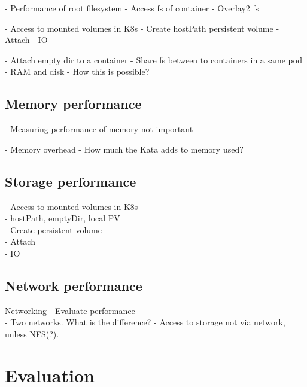 - Performance of root filesystem
	- Access fs of container
	- Overlay2 fs

- Access to mounted volumes in K8s
	- Create hostPath persistent volume
	- Attach
	- IO

- Attach empty dir to a container
	- Share fs between to containers in a same pod
	- RAM and disk
	- How this is possible?

\subsection{Memory performance}

- Measuring performance of memory not important

- Memory overhead
	- How much the Kata adds to memory used?

\subsection{Storage performance}

- Access to mounted volumes in K8s \\
    - hostPath, emptyDir, local PV \\
	- Create persistent volume \\
	- Attach \\
	- IO \\

\subsection{Network performance}

Networking
    - Evaluate performance \\
    - Two networks. What is the difference?
    - Access to storage not via network, unless NFS(?).

\section{Evaluation}